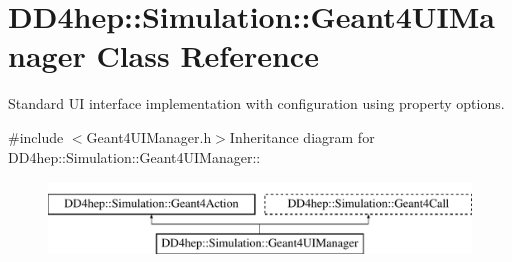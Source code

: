 \hypertarget{class_d_d4hep_1_1_simulation_1_1_geant4_u_i_manager}{
\section{DD4hep::Simulation::Geant4UIManager Class Reference}
\label{class_d_d4hep_1_1_simulation_1_1_geant4_u_i_manager}
}


Standard UI interface implementation with configuration using property options.  


{\ttfamily \#include $<$Geant4UIManager.h$>$}Inheritance diagram for DD4hep::Simulation::Geant4UIManager::\begin{figure}[H]
\begin{center}
\leavevmode
\includegraphics[height=2cm]{class_d_d4hep_1_1_simulation_1_1_geant4_u_i_manager}
\end{center}
\end{figure}
